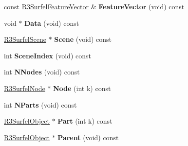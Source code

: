 \begin{DoxyCompactItemize}
\item 
const \hyperlink{class_r3_surfel_feature_vector}{R3\+Surfel\+Feature\+Vector} \& {\bfseries Feature\+Vector} (void) const \hypertarget{class_r3_surfel_object_af4a26074c6e2384adcdf877f9186bf23}{}\label{class_r3_surfel_object_af4a26074c6e2384adcdf877f9186bf23}

\item 
void $\ast$ {\bfseries Data} (void) const \hypertarget{class_r3_surfel_object_a5bd5b6a2353617a7baa548b2b02e496e}{}\label{class_r3_surfel_object_a5bd5b6a2353617a7baa548b2b02e496e}

\item 
\hyperlink{class_r3_surfel_scene}{R3\+Surfel\+Scene} $\ast$ {\bfseries Scene} (void) const \hypertarget{class_r3_surfel_object_aa0402c35ba9103955ff47cd340dd9d44}{}\label{class_r3_surfel_object_aa0402c35ba9103955ff47cd340dd9d44}

\item 
int {\bfseries Scene\+Index} (void) const \hypertarget{class_r3_surfel_object_afe4db01bf37beac2c6567a237595172d}{}\label{class_r3_surfel_object_afe4db01bf37beac2c6567a237595172d}

\item 
int {\bfseries N\+Nodes} (void) const \hypertarget{class_r3_surfel_object_a79e04eb648cbc5daa4d938466e3cc6e6}{}\label{class_r3_surfel_object_a79e04eb648cbc5daa4d938466e3cc6e6}

\item 
\hyperlink{class_r3_surfel_node}{R3\+Surfel\+Node} $\ast$ {\bfseries Node} (int k) const \hypertarget{class_r3_surfel_object_a25eac52b28063d908dff284fb050fcd2}{}\label{class_r3_surfel_object_a25eac52b28063d908dff284fb050fcd2}

\item 
int {\bfseries N\+Parts} (void) const \hypertarget{class_r3_surfel_object_ad0aea807de98013f527a9d491a5cdd33}{}\label{class_r3_surfel_object_ad0aea807de98013f527a9d491a5cdd33}

\item 
\hyperlink{class_r3_surfel_object}{R3\+Surfel\+Object} $\ast$ {\bfseries Part} (int k) const \hypertarget{class_r3_surfel_object_ad4343c4c1c87474ddd493ec96a11614d}{}\label{class_r3_surfel_object_ad4343c4c1c87474ddd493ec96a11614d}

\item 
\hyperlink{class_r3_surfel_object}{R3\+Surfel\+Object} $\ast$ {\bfseries Parent} (void) const \hypertarget{class_r3_surfel_object_a2de7a3c39423f9cf13be912a0482f506}{}\label{class_r3_surfel_object_a2de7a3c39423f9cf13be912a0482f506}


\end{DoxyCompactItemize}
